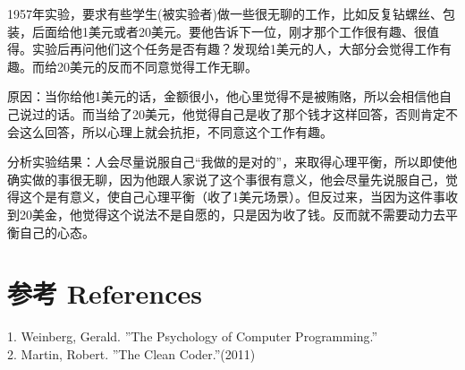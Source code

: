 1957年实验，要求有些学生(被实验者)做一些很无聊的工作，比如反复钻螺丝、包装，后面给他1美元或者20美元。要他告诉下一位，刚才那个工作很有趣、很值得。实验后再问他们这个任务是否有趣？发现给1美元的人，大部分会觉得工作有趣。而给20美元的反而不同意觉得工作无聊。

原因：当你给他1美元的话，金额很小，他心里觉得不是被贿赂，所以会相信他自己说过的话。而当给了20美元，他觉得自己是收了那个钱才这样回答，否则肯定不会这么回答，所以心理上就会抗拒，不同意这个工作有趣。

分析实验结果：人会尽量说服自己``我做的是对的''，来取得心理平衡，所以即使他确实做的事很无聊，因为他跟人家说了这个事很有意义，他会尽量先说服自己，觉得这个是有意义，使自己心理平衡（收了1美元场景）。但反过来，当因为这件事收到20美金，他觉得这个说法不是自愿的，只是因为收了钱。反而就不需要动力去平衡自己的心态。\\

\hypertarget{ux9644ux4ef6}{%
\section{参考 References}\label{ux9644ux4ef6}}

1. Weinberg, Gerald. ''The Psychology of Computer Programming.''\\
2. Martin, Robert. ''The Clean Coder.''(2011)\\




